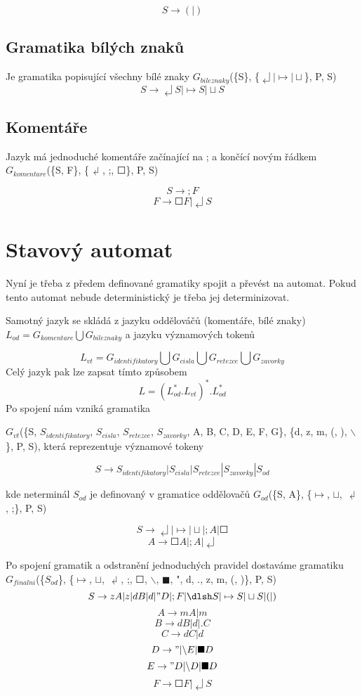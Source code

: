 \documentclass[a4paper,11pt]{article}
\begin{document}
$$S \rightarrow (|)$$

\subsection{Gramatika bílých znaků}
Je gramatika popisující všechny bílé znaky $G_{bileznaky}$(\{S\}, \{$\dlsh | \mapsto | \sqcup$\}, P, S)
$$S \rightarrow  \dlsh S | \mapsto S | \sqcup S$$

\subsection{Komentáře}
Jazyk má jednoduché komentáře začínající na ; a končící novým řádkem $G_{komentare}$(\{S, F\}, \{$\dlsh$, ;, $\Square$\}, P, S)

$$S \rightarrow ;F$$
$$F \rightarrow \Square F | \dlsh S$$

\section{Stavový automat}
Nyní je třeba z předem definované gramatiky spojit a převést na automat. Pokud tento automat nebude deterministický je třeba jej determinizovat.

Samotný jazyk se skládá z jazyku oddělováčů (komentáře, bílé znaky) $L_{od} = G_{komentare} \bigcup G_{bileznaky}$ a jazyku významových tokenů 

$$L_{vt} = G_{identifikatory} \bigcup G_{cisla} \bigcup G_{retezce} \bigcup G_{zavorky}$$
Celý jazyk pak lze zapsat tímto způsobem 
$$L = (L^{*}_{od}.L_{vt})^{*}.L^{*}_{od}$$
Po spojení nám vzniká gramatika
 
$G_{vt}$(\{S, $S_{identifikatory}$, $S_{cisla}$, $S_{retezce}$, $S_{zavorky}$, A, B, C, D, E, F, G\}, \{d, z, m, (, ), $\backslash$ \}, P, S), která reprezentuje významové tokeny 

$$S \rightarrow S_{identifikatory} | S_{cisla} | S_{retezce} | S_{zavorky} | S_{od}$$

kde neterminál $S_{od}$ je definovaný v gramatice oddělovačů $G_{od}$(\{S, A\}, \{$\mapsto$, $\sqcup$, $\dlsh$, ;\}, P, S)

$$S \rightarrow \dlsh | \mapsto | \sqcup | ;A | \Square$$
$$A \rightarrow \Square A | ;A | \dlsh $$

Po spojení gramatik a odstranění jednoduchých pravidel dostaváme gramatiku
$G_{finalni}$(\{$S_{od}$\}, \{$\mapsto$, $\sqcup$, $\dlsh$, ;, $\Square$, $\backslash$, $\blacksquare$, ", d, ., z, m, (, )\}, P, S)
$$S \rightarrow zA | z | dB | d | "D | ;F | \dlsh S | \mapsto S | \sqcup S | ( | )$$
$$A \rightarrow mA | m$$
$$B \rightarrow dB | d | .C$$
$$C \rightarrow dC | d$$
$$D \rightarrow " | \backslash E | \blacksquare D$$
$$E \rightarrow "D | \backslash D | \blacksquare D$$
$$F \rightarrow \Square F | \dlsh S$$
\newpage
\end{document}
